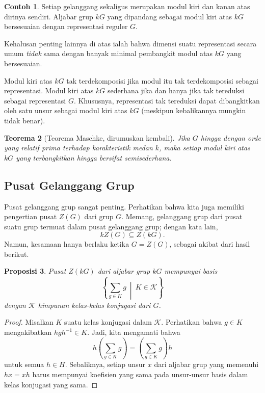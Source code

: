 \documentclass[12pt]{article}
\theoremstyle{plain}
\newtheorem{theorem}{Teorema}[section]
\newtheorem{proposition}[theorem]{Proposisi}
\theoremstyle{definition}
\newtheorem{example}[theorem]{Contoh}
\theoremstyle{remark}
\numberwithin{equation}{section}
\begin{document}
\begin{example}
Setiap gelanggang sekaligus merupakan modul kiri dan kanan atas dirinya sendiri.
Aljabar grup $kG$ yang dipandang sebagai modul kiri atas $kG$ bersesuaian dengan
representasi reguler $G$.
\end{example}

Kehalusan penting lainnya di atas ialah bahwa dimensi suatu
representasi secara umum \emph{tidak} sama dengan banyak minimal
pembangkit modul atas $kG$ yang bersesuaian.

Modul kiri atas $kG$ tak terdekomposisi jika modul itu tak terdekomposisi sebagai
representasi.
Modul kiri atas $kG$ sederhana jika dan hanya jika tak tereduksi
sebagai representasi $G$.
Khususnya, representasi tak tereduksi dapat
dibangkitkan oleh satu unsur sebagai modul kiri atas $kG$ (meskipun kebalikannya mungkin
tidak benar).

\begin{theorem}[Teorema Maschke, dirumuskan kembali]
Jika $G$ hingga dengan orde yang relatif prima terhadap karakteristik medan $k$,
maka setiap modul kiri atas $kG$ yang terbangkitkan hingga bersifat semisederhana.
\end{theorem}

\subsection{Pusat Gelanggang Grup}

Pusat gelanggang grup sangat penting.
Perhatikan bahwa kita juga memiliki pengertian pusat $Z(G)$ dari grup $G$.
Memang, gelanggang grup dari pusat suatu grup termuat dalam
pusat gelanggang grup; dengan kata lain,
\[
kZ(G) \subseteq Z(kG).
\]
Namun, kesamaan hanya berlaku ketika $G=Z(G)$, sebagai akibat dari
hasil berikut.

\begin{proposition}
Pusat $Z(kG)$ dari aljabar grup $kG$ mempunyai basis
\[
\left\{
\sum_{g \in K} g\ \middle|\ K \in \mathcal{K}
\right\}
\]
dengan $\mathcal{K}$ himpunan kelas-kelas konjugasi dari $G$.
\end{proposition}

\begin{proof}
Misalkan $K$ suatu kelas konjugasi dalam $\mathcal{K}$.
Perhatikan bahwa $g \in K$ mengakibatkan
$hgh^{-1} \in K$.
Jadi, kita mengamati bahwa
\[
h\left(\sum_{g \in K} g\right)
=\left(\sum_{g \in K} g\right) h
\]
untuk semua $h \in H$. 
Sebaliknya, setiap unsur $x$ dari aljabar grup
yang memenuhi $hx=xh$ harus mempunyai koefisien yang sama
pada unsur-unsur basis dalam kelas konjugasi yang sama.
\end{proof}
\end{document}
